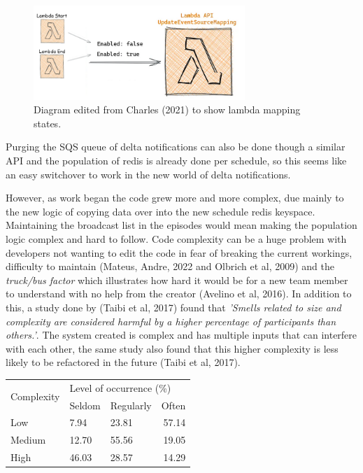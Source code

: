   \begin{figure}[H]
    \centering
    \includegraphics[width=8cm]{assets/lambdaMapping.png}
    \caption{Diagram edited from Charles (2021) to show lambda mapping states.}
    \label{fig:lambdaMapping}
  \end{figure}

  Purging the SQS queue of delta notifications can also be done though a similar API and the population of redis is already done per schedule, so 
  this seems like an easy switchover to work in the new world of delta notifications.

  However, as work began the code grew more and more complex, due mainly to the new logic of copying data over into the new schedule redis keyspace.
  Maintaining the broadcast list in the episodes would mean making the population logic complex and hard to follow. Code complexity can be a huge 
  problem with developers not wanting to edit the code in fear of breaking the current workings, difficulty to maintain 
  (Mateus, Andre, 2022 and Olbrich et al, 2009) and the \textit{truck/bus factor} which illustrates how hard it would be for a new team member to 
  understand with no help from the creator (Avelino et al, 2016). In addition to this, a study done by (Taibi et al, 2017) found that 
  \textit{'Smells related to size and complexity are considered harmful by a higher percentage of participants than others.'}. The system created is 
  complex and has multiple inputs that can interfere with each other, the same study also found that this higher complexity is less likely to be 
  refactored in the future (Taibi et al, 2017).

\begin{table}[H]
  \centering
  \begin{tabular}{|l|llr|}
  \hline
  \multicolumn{1}{|c|}{\multirow{2}{*}{Complexity}} & \multicolumn{3}{l|}{Level of occurrence (\%)}                        \\ \cline{2-4} 
  \multicolumn{1}{|c|}{}                            & \multicolumn{1}{l|}{Seldom} & \multicolumn{1}{l|}{Regularly} & Often \\ \hline
  Low                                               & \multicolumn{1}{l|}{7.94}   & \multicolumn{1}{l|}{23.81}     & 57.14 \\ \hline
  Medium                                            & \multicolumn{1}{l|}{12.70}  & \multicolumn{1}{l|}{55.56}     & 19.05 \\ \hline
  High                                              & \multicolumn{1}{l|}{46.03}  & \multicolumn{1}{l|}{28.57}     & 14.29 \\ \hline
  \end{tabular}
  \end{table}

